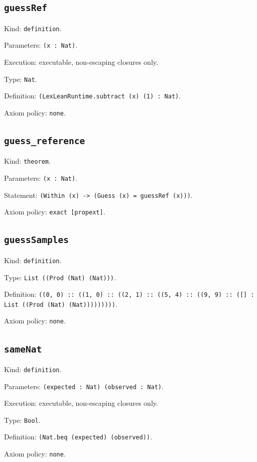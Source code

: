 \documentclass[11pt]{article}
\begin{document}
\subsection*{\texttt{guessRef}}
\noindent Kind: \texttt{definition}.\par
\noindent Parameters: \texttt{(x : Nat)}.\par
\noindent Execution: executable, non-escaping closures only.\par
\noindent Type: \texttt{Nat}.\par
\noindent Definition: \texttt{(LexLeanRuntime.subtract (x) (1) : Nat)}.\par
\noindent Axiom policy: \texttt{none}.\par
\subsection*{\texttt{guess\_reference}}
\noindent Kind: \texttt{theorem}.\par
\noindent Parameters: \texttt{(x : Nat)}.\par
\noindent Statement: \texttt{(Within (x) -> (Guess (x) = guessRef (x)))}.\par
\noindent Axiom policy: \texttt{exact [propext]}.\par
\subsection*{\texttt{guessSamples}}
\noindent Kind: \texttt{definition}.\par
\noindent Type: \texttt{List ((Prod (Nat) (Nat)))}.\par
\noindent Definition: \texttt{((0, 0) :: ((1, 0) :: ((2, 1) :: ((5, 4) :: ((9, 9) :: ([] : List ((Prod (Nat) (Nat)))))))))}.\par
\noindent Axiom policy: \texttt{none}.\par
\subsection*{\texttt{sameNat}}
\noindent Kind: \texttt{definition}.\par
\noindent Parameters: \texttt{(expected : Nat) (observed : Nat)}.\par
\noindent Execution: executable, non-escaping closures only.\par
\noindent Type: \texttt{Bool}.\par
\noindent Definition: \texttt{(Nat.beq (expected) (observed))}.\par
\noindent Axiom policy: \texttt{none}.\par
\end{document}
